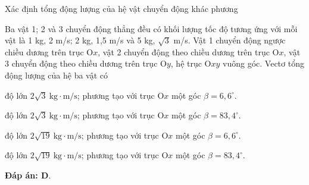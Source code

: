 \begin{dang}{Xác định tổng động lượng của hệ vật chuyển động khác phương}
{		Ba vật 1; 2 và 3 chuyển động thẳng đều có khối lượng tốc độ tương ứng với mỗi vật là 1 kg, 2 m/s; 2 kg, 1,5 m/s và 5 kg, $\sqrt {3}$ m/s. Vật 1 chuyển động ngược chiều dương trên trục O$x$, vật 2 chuyển động theo chiều dương trên trục O$x$, vật 3 chuyển động theo chiều dương trên trục O$y$, hệ trục O$xy$ vuông góc. Vectơ tổng động lượng của hệ ba vật có
		\begin{mcq}
			\item độ lớn $2\sqrt{3}\ \text{kg} \cdot \text{m/s}$; phương tạo với trục O$x$ một góc $\beta = 6,6^\circ$.
			\item độ lớn $2\sqrt{3}\ \text{kg} \cdot \text{m/s}$; phương tạo với trục O$x$ một góc $\beta = 83,4^\circ$. 
			\item độ lớn $2\sqrt{19}\ \text{kg} \cdot \text{m/s}$; phương tạo với trục O$x$ một góc $\beta = 6,6^\circ$.
			\item độ lớn $2\sqrt{19}\ \text{kg} \cdot \text{m/s}$; phương tạo với trục O$x$ một góc $\beta = 83,4^\circ$.
		\end{mcq}
		
		\textbf{Đáp án: D}.
	}
\end{dang}
